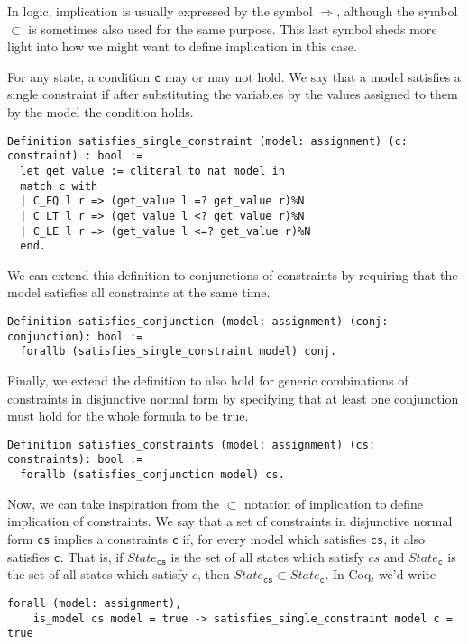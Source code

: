 In logic, implication is usually expressed by the symbol $\Rightarrow$, although the symbol $\subset$ is
sometimes also used for the same purpose. This last symbol sheds more light into how we might want to
define implication in this case.

For any state, a condition \texttt{c} may or may not hold. We say that a model satisfies a single constraint if
after substituting the variables by the values assigned to them by the model the condition holds.

\begin{verbatim}
Definition satisfies_single_constraint (model: assignment) (c: constraint) : bool :=
  let get_value := cliteral_to_nat model in 
  match c with
  | C_EQ l r => (get_value l =? get_value r)%N
  | C_LT l r => (get_value l <? get_value r)%N
  | C_LE l r => (get_value l <=? get_value r)%N
  end.
\end{verbatim}

We can extend this definition to conjunctions of constraints by requiring that the model satisfies all 
constraints at the same time.

\begin{verbatim}
Definition satisfies_conjunction (model: assignment) (conj: conjunction): bool :=
  forallb (satisfies_single_constraint model) conj.
\end{verbatim}

Finally, we extend the definition to also hold for generic combinations of constraints in disjunctive normal
form by specifying that at least one conjunction must hold for the whole formula to be true.

\begin{verbatim}
Definition satisfies_constraints (model: assignment) (cs: constraints): bool :=
  forallb (satisfies_conjunction model) cs.
\end{verbatim}

Now, we can take inspiration from the $\subset$ notation of implication to define implication of 
constraints. We say that a set of constraints in disjunctive normal form \texttt{cs} implies a constraints \texttt{c} if,
for every model which satisfies \texttt{cs}, it also satisfies \texttt{c}. That is, if $State_{\texttt{cs}}$ is the set of
all states which satisfy $cs$ and $State_{\texttt{c}}$ is the set of all states which satisfy $c$, then
$State_{\texttt{cs}} \subset State_{\texttt{c}}$. In Coq, we'd write

\begin{verbatim}
forall (model: assignment),
    is_model cs model = true -> satisfies_single_constraint model c = true
\end{verbatim}

